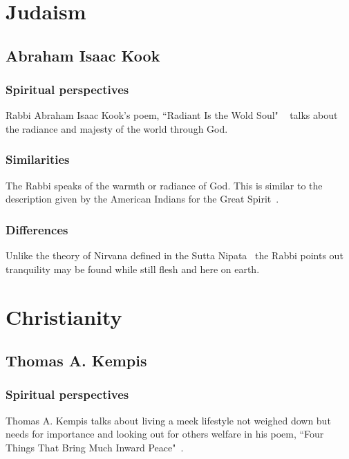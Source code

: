 \documentclass[11pt,a4paper]{scrartcl} %
\begin{document}
    \maketitle
    
    \begin{abstract}
  
    \end{abstract}
       
    \tableofcontents
    
    \section{Judaism}
    \subsection{Abraham Isaac Kook}
     \subsubsection{Spiritual perspectives}
     Rabbi Abraham Isaac Kook's poem, ``Radiant Is the Wold Soul" ~\citealp[pg. 39]{eknath} talks about the radiance and majesty of the world through God.
     \subsubsection{Similarities}
    The Rabbi speaks of the warmth or radiance of God. This is similar to the description given by the American Indians for the Great Spirit~\citealp[pg. 186]{eknath}.
     \subsubsection{Differences}
   Unlike the theory of Nirvana defined in the Sutta Nipata~\citealp[pg. 200]{eknath} the Rabbi points out tranquility may be found while still flesh and here on earth.
    \section{Christianity}
    \subsection{Thomas A. Kempis}
\subsubsection{Spiritual perspectives}
 Thomas A. Kempis talks about living a meek lifestyle not weighed down but needs for importance and looking out for others welfare in his poem, ``Four Things That Bring Much Inward Peace"~\citealp[pg. 199]{eknath}.
\end{document}
